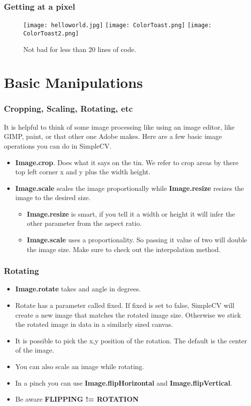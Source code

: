 \documentclass[compress]{beamer}
\begin{document}
\begin{frame}
\frametitle{Getting at a pixel}
 \begin{figure}
     \texttt{[image: helloworld.jpg]}
     \quad
     \texttt{[image: ColorToast.png]}
     \quad
     \texttt{[image: ColorToast2.png]}
     \caption{Not bad for less than 20 lines of code.}
 \end{figure}

\end{frame}
\section{Basic Manipulations}
\begin{frame}
\frametitle{Cropping, Scaling, Rotating, etc}
It is helpful to think of some image processing like using an image
editor, like GIMP, paint, or that other one Adobe makes. Here are a
few basic image operations you can do in SimpleCV. 
\begin{itemize}
\item \textbf{Image.crop}. Does what it says on the tin. We refer to
  crop areas by there top left corner x and y plus the width height.
\item \textbf{Image.scale} scales the image proportionally while
  \textbf{Image.resize} resizes the image to the desired size. 
  \begin{itemize}
    \item \textbf{Image.resize} is smart, if you tell it a width or
      height it will infer the other parameter from the aspect ratio.
    \item \textbf{Image.scale} uses a proportionality. So passing it
      value of two will double the image size. Make sure to check out
      the interpolation method.
  \end{itemize}
\end{itemize}
\end{frame}
\begin{frame}
\frametitle{Rotating}
\begin{itemize}
  \item \textbf{Image.rotate} takes and angle in degrees.
  \item Rotate has a parameter called fixed. If fixed
        is set to false, SimpleCV will create a new image that matches
        the rotated image size. Otherwise we stick the rotated image
        in data in a similarly sized canvas. 
  \item It is possible to pick the x,y position of the rotation. The
    default is the center of the image.
  \item You can also scale an image while rotating.
  \item In a pinch you can use \textbf{Image.flipHorizontal} and
    \textbf{Image.flipVertical}.
   \item Be aware \textbf{FLIPPING != ROTATION}
\end{itemize}
\end{frame}
\end{document}
